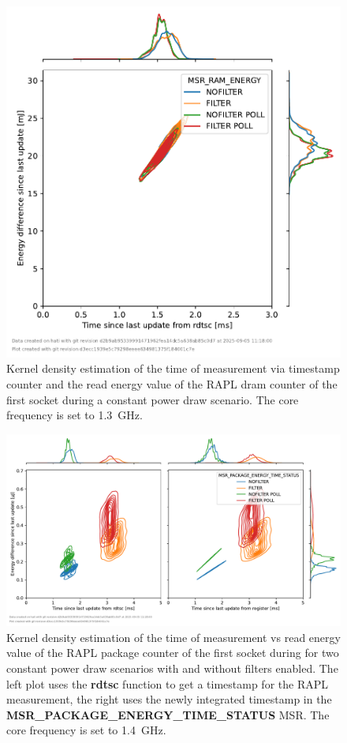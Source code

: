 \begin{figure}[]
    \centering
    \includegraphics[width=0.54\columnwidth]{fig/rapl-update-intervals/MSR_RAM_ENERGY_1300000.pdf}
    \caption{Kernel density estimation of the time of measurement via timestamp counter and the read energy value of the RAPL dram counter of the first socket during a constant power draw scenario.
    The core frequency is set to \SI{1.3}{\GHz}.}
\end{figure}

\clearpage
\begin{figure}[]
    \centering
    \includegraphics[width=\columnwidth]{fig/rapl-update-intervals/MSR_PACKAGE_ENERGY_TIME_STATUS_1400000.pdf}
    \caption{Kernel density estimation of the time of measurement vs read energy value of the RAPL package counter of the first socket during for two constant power draw scenarios with and without filters enabled.
    The left plot uses the \textbf{rdtsc} function to get a timestamp for the RAPL measurement, the right uses the newly integrated timestamp in the \textbf{MSR\_PACKAGE\_ENERGY\_TIME\_STATUS} MSR.
    The core frequency is set to \SI{1.4}{\GHz}.}
\end{figure}

